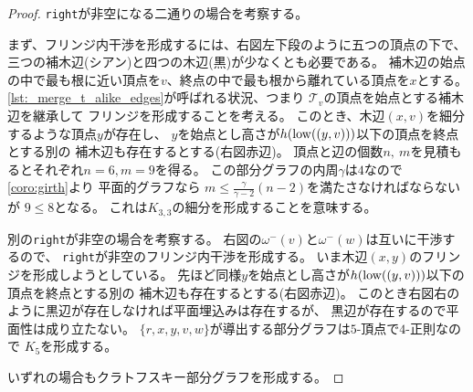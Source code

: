 \begin{paracol}{2}
\begin{proof}
{\tt right}が非空になる二通りの場合を考察する。

まず、フリンジ内干渉を形成するには、右図左下段のように五つの頂点の下で、
三つの補木辺(シアン)と四つの木辺(黒)が少なくとも必要である。
補木辺の始点の中で最も根に近い頂点を$v$、終点の中で最も根から離れている頂点を$x$とする。
\lstrefname\ref{lst:_merge_t_alike_edges}が呼ばれる状況、つまり
${\mathcal T}_v$の頂点を始点とする補木辺を継承して
フリンジを形成することを考える。
このとき、木辺$(x, v)$を細分するような頂点$y$が存在し、
$y$を始点とし高さが$h(\operatorname{low}((y, v)))$以下の頂点を終点とする別の
補木辺も存在するとする(右図赤辺)。
頂点と辺の個数$n,~m$を見積もるとそれぞれ$n=6, m=9$を得る。
この部分グラフの内周$\gamma$は$4$なので
\cref{coro:girth}より
平面的グラフなら
$m \leq \frac{\gamma}{\gamma-2}(n-2)$を満たさなければならないが
$9\leq 8$となる。
これは$K_{3,3}$の細分を形成することを意味する。

別の{\tt right}が非空の場合を考察する。
右図の$\omega^-(v)$と$\omega^-(w)$は互いに干渉するので、
{\tt right}が非空のフリンジ内干渉を形成する。
いま木辺$(x, y)$のフリンジを形成しようとしている。
先ほど同様$y$を始点とし高さが$h(\operatorname{low}((y, v)))$以下の頂点を終点とする別の
補木辺も存在するとする(右図赤辺)。
このとき右図右のように黒辺が存在しなければ平面埋込みは存在するが、
黒辺が存在するので平面性は成り立たない。
$\{r, x, y, v, w\}$が導出する部分グラフは$5$-頂点で$4$-正則なので
$K_5$を形成する。

いずれの場合もクラトフスキー部分グラフを形成する。
\end{proof}






\end{paracol}
